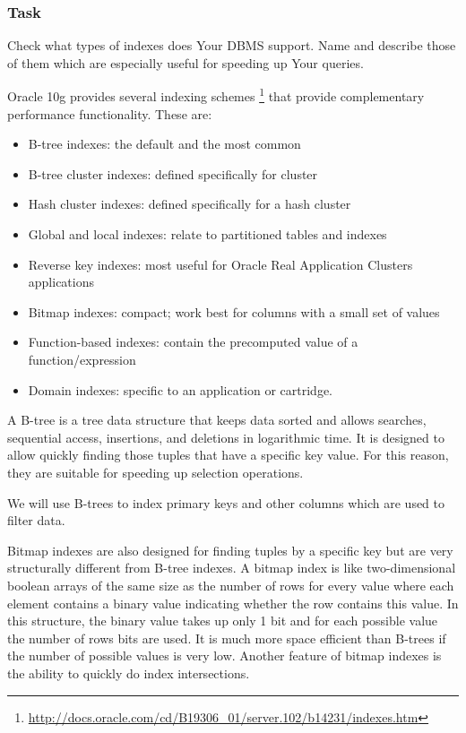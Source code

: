 \subsubsection*{Task} 
Check what types of indexes does Your DBMS support. Name and describe those of them which are especially useful for speeding up Your
queries.

Oracle 10g provides several indexing schemes
\footnote{\url{http://docs.oracle.com/cd/B19306_01/server.102/b14231/indexes.htm}}
that provide complementary performance functionality. These are:
\begin{itemize}
\item B-tree indexes: the default and the most common
\item B-tree cluster indexes: defined specifically for cluster
\item Hash cluster indexes: defined specifically for a hash cluster
\item Global and local indexes: relate to partitioned tables and indexes
\item Reverse key indexes: most useful for Oracle Real Application Clusters applications
\item Bitmap indexes: compact; work best for columns with a small set of values
\item Function-based indexes: contain the precomputed value of a function/expression
\item Domain indexes: specific to an application or cartridge.
\end{itemize}

A B-tree is a tree data structure that keeps data sorted and allows searches, sequential access, insertions, and deletions in logarithmic time. It is designed to allow quickly finding those tuples that have a specific key value. For this reason, they are suitable for speeding up selection operations. 

We will use B-trees to index primary keys and other columns which are used to filter data.

Bitmap indexes are also designed for finding tuples by a specific key but are very structurally different from B-tree indexes. A bitmap index is like two-dimensional boolean arrays of the same size as the number of rows for every value where each element contains a binary value indicating whether the row contains this value. In this structure, the binary value takes up only 1 bit and for each possible value the number of rows bits are used. It is much more space efficient than B-trees if the number of possible values is very low. Another feature of bitmap indexes is the ability to quickly do index intersections.

